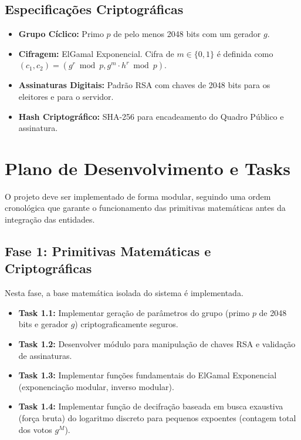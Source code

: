 \documentclass[12pt, a4paper]{article}
\begin{document}
\subsection{Especificações Criptográficas}
\begin{itemize}
    \item \textbf{Grupo Cíclico:} Primo $p$ de pelo menos 2048 bits com um gerador $g$.
    \item \textbf{Cifragem:} ElGamal Exponencial. Cifra de $m \in \{0, 1\}$ é definida como $(c_1, c_2) = (g^r \bmod p, g^m \cdot h^r \bmod p)$.
    \item \textbf{Assinaturas Digitais:} Padrão RSA com chaves de 2048 bits para os eleitores e para o servidor.
    \item \textbf{Hash Criptográfico:} SHA-256 para encadeamento do Quadro Público e assinatura.
\end{itemize}

\section{Plano de Desenvolvimento e Tasks}

O projeto deve ser implementado de forma modular, seguindo uma ordem cronológica que garante o funcionamento das primitivas matemáticas antes da integração das entidades.

\subsection{Fase 1: Primitivas Matemáticas e Criptográficas}
Nesta fase, a base matemática isolada do sistema é implementada.
\begin{itemize}[label=$\square$]
    \item \textbf{Task 1.1:} Implementar geração de parâmetros do grupo (primo $p$ de 2048 bits e gerador $g$) criptograficamente seguros.
    \item \textbf{Task 1.2:} Desenvolver módulo para manipulação de chaves RSA e validação de assinaturas.
    \item \textbf{Task 1.3:} Implementar funções fundamentais do ElGamal Exponencial (exponenciação modular, inverso modular).
    \item \textbf{Task 1.4:} Implementar função de decifração baseada em busca exaustiva (força bruta) do logaritmo discreto para pequenos expoentes (contagem total dos votos $g^M$).
\end{itemize}
\end{document}
